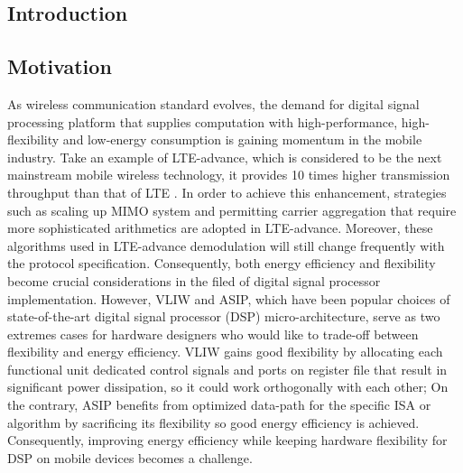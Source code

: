 \documentclass[12pt]{article}
\begin{document}
\begin{CJK}{UTF8}{bkai}
\doublespacing


\section{Introduction}

    \subsection{Motivation}
        As wireless communication standard evolves, the demand for digital signal processing platform that supplies computation with high-performance, high-flexibility and low-energy consumption is gaining momentum in the mobile industry. 
        Take an example of LTE-advance, which is considered to be the next mainstream mobile wireless technology, it provides 10 times higher transmission throughput than that of LTE \cite{lte}. 
        In order to achieve this enhancement, strategies such as scaling up MIMO system and permitting carrier aggregation \cite{carrier} that require more sophisticated arithmetics are adopted in LTE-advance.
        Moreover, these algorithms used in LTE-advance demodulation will still change frequently with the protocol specification.
        Consequently, both energy efficiency and flexibility become crucial considerations in the filed of digital signal processor implementation. 
        However, VLIW and ASIP, which have been popular choices of state-of-the-art digital signal processor (DSP) micro-architecture, serve as two extremes cases for hardware designers who would like to trade-off between flexibility and energy efficiency. 
        VLIW gains good flexibility by allocating each functional unit dedicated control signals and ports on register file that result in significant power dissipation, so it could work orthogonally with each other; 
        On the contrary, ASIP benefits from optimized data-path for the specific ISA or algorithm by sacrificing its flexibility so good energy efficiency is achieved. 
        Consequently, improving energy efficiency while keeping hardware flexibility for DSP on mobile devices becomes a challenge.	\\


\end{CJK}
\end{document}
